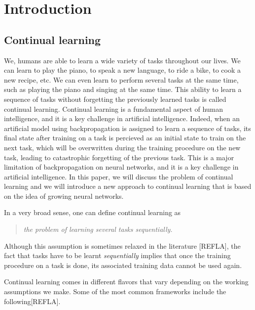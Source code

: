 \documentclass[11pt]{article}
\begin{document}
\section{Introduction}



\subsection{Continual learning}


We, humans are able to learn a wide variety of tasks throughout our lives. We can learn to play the piano, to speak a new language, to ride a bike, to cook a new recipe, etc. We can even learn to perform several tasks at the same time, such as playing the piano and singing at the same time. This ability to learn a sequence of tasks without forgetting the previously learned tasks is called continual learning. Continual learning is a fundamental aspect of human intelligence, and it is a key challenge in artificial intelligence. Indeed, when an artificial model using backpropagation is assigned to learn a sequence of tasks, its final state after training on a task is percieved as an initial state to train on the next task, which will be overwritten during the training procedure on the new task, leading to catastrophic forgetting of the previous task. This is a major limitation of backpropagation on neural networks, and it is a key challenge in artificial intelligence. In this paper, we will discuss the problem of continual learning and we will introduce a new approach to continual learning that is based on the idea of growing neural networks.

\vspace{2mm}
\noindent
In a very broad sense, one can define continual learning as

\begin{quote}
    \itshape
    \centering
    the problem of learning several tasks sequentially.
\end{quote}
Although this assumption is sometimes relaxed in the literature [REFLA], the fact that tasks have to be learnt \textit{sequentially} implies that once the training procedure on a task is done, its associated training data cannot be used again. 

\vspace{2mm}
\noindent
Continual learning comes in different flavors that vary depending on the working assumptions we make. Some of the most common frameworks include the following[REFLA].
\end{document}
